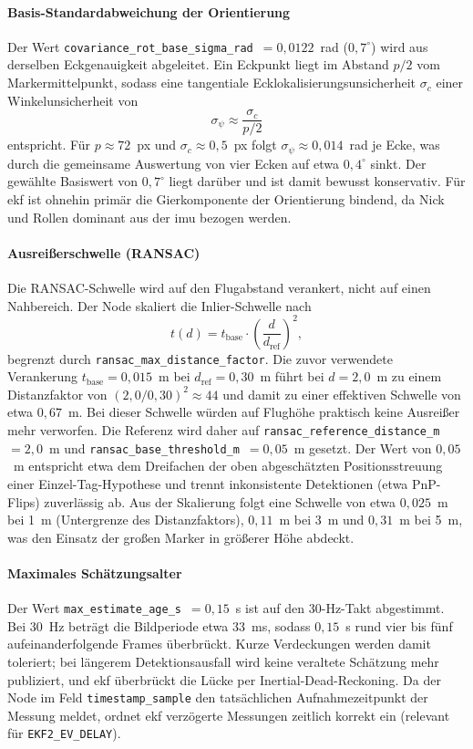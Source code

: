 \paragraph{Basis-Standardabweichung der Orientierung}
Der Wert \texttt{covariance\_rot\_base\_sigma\_rad}~$=0{,}0122$~rad ($0{,}7^\circ$) wird aus derselben Eckgenauigkeit abgeleitet.
Ein Eckpunkt liegt im Abstand $p/2$ vom Markermittelpunkt, sodass eine tangentiale Ecklokalisierungsunsicherheit $\sigma_c$ einer Winkelunsicherheit von
\begin{equation}
\sigma_\psi \approx \frac{\sigma_c}{p/2}
\end{equation}
entspricht.
Für $p\approx 72$~px und $\sigma_c\approx 0{,}5$~px folgt $\sigma_\psi\approx 0{,}014$~rad je Ecke, was durch die gemeinsame Auswertung von vier Ecken auf etwa $0{,}4^\circ$ sinkt.
Der gewählte Basiswert von $0{,}7^\circ$ liegt darüber und ist damit bewusst konservativ.
Für \gls{ekf} ist ohnehin primär die Gierkomponente der Orientierung bindend, da Nick und Rollen dominant aus der \gls{imu} bezogen werden.

\paragraph{Ausreißerschwelle (RANSAC)}
Die RANSAC-Schwelle wird auf den Flugabstand verankert, nicht auf einen Nahbereich.
Der Node skaliert die Inlier-Schwelle nach
\begin{equation}
t(d) = t_\text{base}\cdot\left(\frac{d}{d_\text{ref}}\right)^{2},
\end{equation}
begrenzt durch \texttt{ransac\_max\_distance\_factor}.
Die zuvor verwendete Verankerung $t_\text{base}=0{,}015$~m bei $d_\text{ref}=0{,}30$~m führt bei $d=2{,}0$~m zu einem Distanzfaktor von $(2{,}0/0{,}30)^2\approx 44$ und damit zu einer effektiven Schwelle von etwa $0{,}67$~m.
Bei dieser Schwelle würden auf Flughöhe praktisch keine Ausreißer mehr verworfen.
Die Referenz wird daher auf \texttt{ransac\_reference\_distance\_m}~$=2{,}0$~m und \texttt{ransac\_base\_threshold\_m}~$=0{,}05$~m gesetzt.
Der Wert von $0{,}05$~m entspricht etwa dem Dreifachen der oben abgeschätzten Positionsstreuung einer Einzel-Tag-Hypothese und trennt inkonsistente Detektionen (etwa PnP-Flips) zuverlässig ab.
Aus der Skalierung folgt eine Schwelle von etwa $0{,}025$~m bei 1~m (Untergrenze des Distanzfaktors), $0{,}11$~m bei 3~m und $0{,}31$~m bei 5~m, was den Einsatz der großen Marker in größerer Höhe abdeckt.

\paragraph{Maximales Schätzungsalter}
Der Wert \texttt{max\_estimate\_age\_s}~$=0{,}15$~s ist auf den 30-Hz-Takt abgestimmt.
Bei 30~Hz beträgt die Bildperiode etwa 33~ms, sodass $0{,}15$~s rund vier bis fünf aufeinanderfolgende Frames überbrückt.
Kurze Verdeckungen werden damit toleriert; bei längerem Detektionsausfall wird keine veraltete Schätzung mehr publiziert, und \gls{ekf} überbrückt die Lücke per Inertial-Dead-Reckoning.
Da der Node im Feld \texttt{timestamp\_sample} den tatsächlichen Aufnahmezeitpunkt der Messung meldet, ordnet \gls{ekf} verzögerte Messungen zeitlich korrekt ein (relevant für \texttt{EKF2\_EV\_DELAY}).

